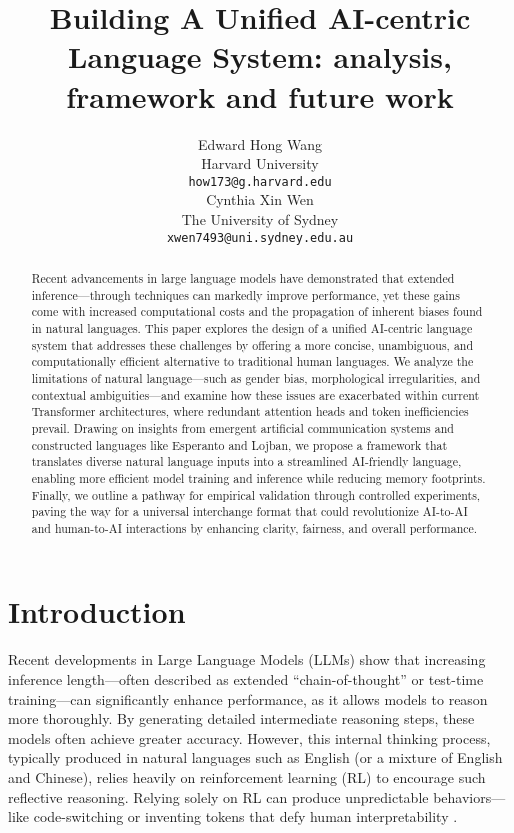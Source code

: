 \documentclass{article} %
\title{Building A Unified AI-centric Language System: analysis, framework and future work}
\author{Edward Hong Wang \\
Harvard University\\
\texttt{how173@g.harvard.edu} \\
\And
Cynthia Xin Wen \\
The University of Sydney\\
\texttt{xwen7493@uni.sydney.edu.au}
}
\begin{document}
\maketitle

\begin{abstract}
Recent advancements in large language models have demonstrated that extended inference—through techniques can markedly improve performance, yet these gains come with increased computational costs and the propagation of inherent biases found in natural languages. This paper explores the design of a unified AI-centric language system that addresses these challenges by offering a more concise, unambiguous, and computationally efficient alternative to traditional human languages. We analyze the limitations of natural language—such as gender bias, morphological irregularities, and contextual ambiguities—and examine how these issues are exacerbated within current Transformer architectures, where redundant attention heads and token inefficiencies prevail. Drawing on insights from emergent artificial communication systems and constructed languages like Esperanto and Lojban, we propose a framework that translates diverse natural language inputs into a streamlined AI-friendly language, enabling more efficient model training and inference while reducing memory footprints. Finally, we outline a pathway for empirical validation through controlled experiments, paving the way for a universal interchange format that could revolutionize AI-to-AI and human-to-AI interactions by enhancing clarity, fairness, and overall performance.
\end{abstract}

\section{Introduction}
Recent developments in Large Language Models (LLMs) show that increasing inference length—often described as extended \cite{Wei2022} “chain-of-thought” or \cite{Wei2022} test-time training—can significantly enhance performance, as it allows models to reason more thoroughly. By generating detailed intermediate reasoning steps, these models often achieve greater accuracy. However, this internal thinking process, typically produced in natural languages such as English (or a mixture of English and Chinese), relies heavily on reinforcement learning (RL) to encourage such reflective reasoning. Relying solely on RL can produce unpredictable behaviors—like code-switching or inventing tokens that defy human interpretability \cite{Li2025}.
\end{document}
